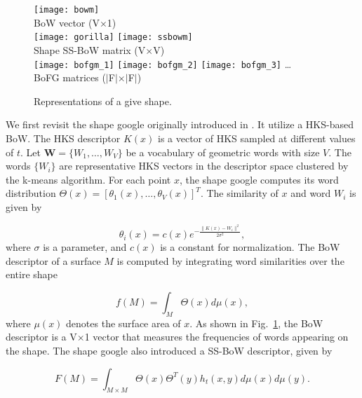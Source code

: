 \begin{figure}
\centering
\texttt{[image: bowm]}\\
BoW vector (V$\times$1)\\
\texttt{[image: gorilla]}
\hspace{20pt}
\texttt{[image: ssbowm]}\\
\hspace{30pt} Shape \hspace{46pt} SS-BoW matrix (V$\times$V)\\
\texttt{[image: bofgm\_1]}
\texttt{[image: bofgm\_2]}
\texttt{[image: bofgm\_3]}
\dots\\
BoFG matrices ($|$F$|$$\times$$|$F$|$)
\caption{Representations of a give shape.}
\label{fig:represent}
\end{figure}

We first revisit the shape google originally introduced in \cite{Ovsjanikov:2009}. It utilize a HKS-based BoW. The HKS descriptor $K(x)$ is a vector of HKS sampled at different values of $t$. Let $\textbf{W}=\{W_1,\dots,W_V\}$ be a vocabulary of geometric words with size $V$. The words $\{W_i\}$ are representative HKS vectors in the descriptor space clustered by the k-means algorithm. For each point $x$, the shape google computes its word distribution $\Theta(x)=[\theta_1(x),\dots,\theta_V(x)]^T$. The similarity of $x$ and word $W_i$ is given by

\begin{equation}\label{eq:similar}
\theta_i(x)=c(x)e^{-\frac{\|K(x)-W_i\|^2}{2\sigma^2}},
\end{equation}
where $\sigma$ is a parameter, and $c(x)$ is a constant for normalization. The BoW descriptor of a surface $M$ is computed by integrating word similarities over the entire shape

\begin{equation}
f(M)=\int_M\Theta(x)d\mu(x),
\end{equation}
where $\mu(x)$ denotes the surface area of $x$. As shown in Fig.~\ref{fig:represent}, the BoW descriptor is a V$\times$1 vector that measures the frequencies of words appearing on the shape. The shape google also introduced a SS-BoW descriptor, given by

\begin{equation}
F(M)=\int_{M\times M}\Theta(x)\Theta^T(y)h_t(x,y)d\mu(x)d\mu(y).
\end{equation}

